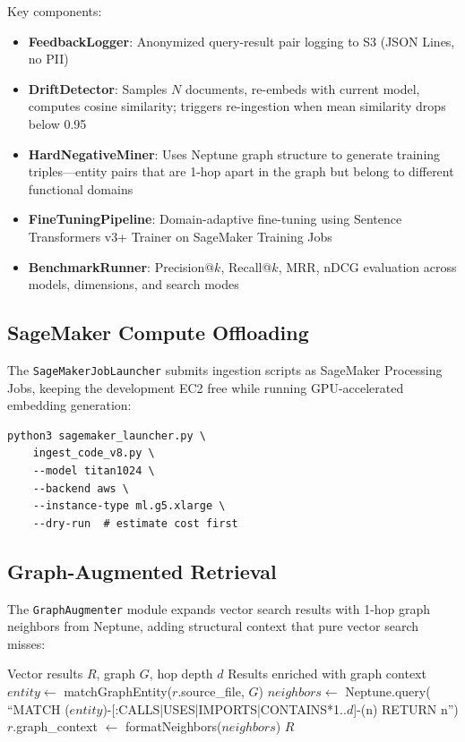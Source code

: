 \documentclass[11pt,letterpaper]{article}
\begin{document}
Key components:

\begin{itemize}[noitemsep]
    \item \textbf{FeedbackLogger}: Anonymized query-result pair logging to S3
          (JSON Lines, no PII)
    \item \textbf{DriftDetector}: Samples $N$ documents, re-embeds with current
          model, computes cosine similarity; triggers re-ingestion when
          mean similarity drops below 0.95
    \item \textbf{HardNegativeMiner}: Uses Neptune graph structure to generate
          training triples---entity pairs that are 1-hop apart in the graph
          but belong to different functional domains
    \item \textbf{FineTuningPipeline}: Domain-adaptive fine-tuning using
          Sentence Transformers v3+ Trainer on SageMaker Training Jobs
    \item \textbf{BenchmarkRunner}: Precision@$k$, Recall@$k$, MRR, nDCG
          evaluation across models, dimensions, and search modes
\end{itemize}

\subsection{SageMaker Compute Offloading}

The \texttt{SageMakerJobLauncher} submits ingestion scripts as SageMaker
Processing Jobs, keeping the development EC2 free while running
GPU-accelerated embedding generation:

\begin{lstlisting}[caption={SageMaker job submission for embedding generation.}]
python3 sagemaker_launcher.py \
    ingest_code_v8.py \
    --model titan1024 \
    --backend aws \
    --instance-type ml.g5.xlarge \
    --dry-run  # estimate cost first
\end{lstlisting}

\subsection{Graph-Augmented Retrieval}

The \texttt{GraphAugmenter} module expands vector search results with
1-hop graph neighbors from Neptune, adding structural context that pure
vector search misses:

\begin{algorithm}[H]
\caption{Graph-Augmented Retrieval}
\label{alg:graph-augment}
\begin{algorithmic}[1]
\REQUIRE Vector results $R$, graph $G$, hop depth $d$
\ENSURE Results enriched with graph context
\FOR{each result $r \in R$}
    \STATE $entity \gets$ matchGraphEntity($r$.source\_file, $G$)
        \STATE $neighbors \gets$ Neptune.query(
            ``MATCH ($entity$)-[:CALLS|USES|IMPORTS|CONTAINS*1..$d$]-(n) RETURN n'')
        \STATE $r$.graph\_context $\gets$ formatNeighbors($neighbors$)
    \ENDIF
\ENDFOR
\RETURN $R$
\end{algorithmic}
\end{algorithm}
\end{document}

